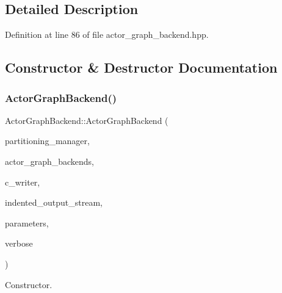 \subsection{Detailed Description}


Definition at line 86 of file actor\+\_\+graph\+\_\+backend.\+hpp.



\subsection{Constructor \& Destructor Documentation}
\mbox{\label{classActorGraphBackend_ac32f8b645a1dec8e32d4911c02d17320}} 
\subsubsection{\texorpdfstring{Actor\+Graph\+Backend()}{ActorGraphBackend()}}
{\footnotesize\ttfamily Actor\+Graph\+Backend\+::\+Actor\+Graph\+Backend (\begin{DoxyParamCaption}\item[{const Partitioning\+Manager\+Const\+Ref \&}]{partitioning\+\_\+manager,  }\item[{const \hyperlink{custom__map_8hpp_ad1ed68f2ff093683ab1a33522b144adc}{Custom\+Unordered\+Map}$<$ Actor\+Graph\+\_\+\+Type, \hyperlink{actor__graph__backend_8hpp_ae30db41c92b2664ac3ed9f9633c49969}{Actor\+Graph\+Backend\+Ref} $>$ \&}]{actor\+\_\+graph\+\_\+backends,  }\item[{const \hyperlink{c__writer_8hpp_a4e9c4dfe17e35f981e27b6dd97f9632c}{C\+Writer\+Ref} \&}]{c\+\_\+writer,  }\item[{const \hyperlink{indented__output__stream_8hpp_ab32278e11151ef292759c88e99b77feb}{Indented\+Output\+Stream\+Ref} \&}]{indented\+\_\+output\+\_\+stream,  }\item[{const \hyperlink{Parameter_8hpp_a37841774a6fcb479b597fdf8955eb4ea}{Parameter\+Const\+Ref} \&}]{parameters,  }\item[{const bool}]{verbose }\end{DoxyParamCaption})}



Constructor. 


